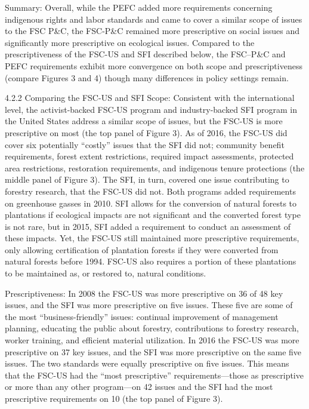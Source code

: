 \documentclass[
      12pt,
            Review ]{article}
\begin{document}
Summary: Overall, while the PEFC added more requirements concerning
indigenous rights and labor standards and came to cover a similar scope
of issues to the FSC P\&C, the FSC-P\&C remained more prescriptive on
social issues and significantly more prescriptive on ecological issues.
Compared to the prescriptiveness of the FSC-US and SFI described below,
the FSC--P\&C and PEFC requirements exhibit more convergence on both
scope and prescriptiveness (compare Figures 3 and 4) though many
differences in policy settings remain.

4.2.2 Comparing the FSC-US and SFI Scope: Consistent with the
international level, the activist-backed FSC-US program and
industry-backed SFI program in the United States address a similar scope
of issues, but the FSC-US is more prescriptive on most (the top panel of
Figure 3). As of 2016, the FSC-US did cover six potentially ``costly''
issues that the SFI did not; community benefit requirements, forest
extent restrictions, required impact assessments, protected area
restrictions, restoration requirements, and indigenous tenure
protections (the middle panel of Figure 3). The SFI, in turn, covered
one issue contributing to forestry research, that the FSC-US did not.
Both programs added requirements on greenhouse gasses in 2010. SFI
allows for the conversion of natural forests to plantations if
ecological impacts are not significant and the converted forest type is
not rare, but in 2015, SFI added a requirement to conduct an assessment
of these impacts. Yet, the FSC-US still maintained more prescriptive
requirements, only allowing certification of plantation forests if they
were converted from natural forests before 1994. FSC-US also requires a
portion of these plantations to be maintained as, or restored to,
natural conditions.

Prescriptiveness: In 2008 the FSC-US was more prescriptive on 36 of 48
key issues, and the SFI was more prescriptive on five issues. These five
are some of the most ``business-friendly'' issues: continual improvement
of management planning, educating the public about forestry,
contributions to forestry research, worker training, and efficient
material utilization. In 2016 the FSC-US was more prescriptive on 37 key
issues, and the SFI was more prescriptive on the same five issues. The
two standards were equally prescriptive on five issues. This means that
the FSC-US had the ``most prescriptive'' requirements---those as
prescriptive or more than any other program---on 42 issues and the SFI
had the most prescriptive requirements on 10 (the top panel of Figure
3).
\end{document}
